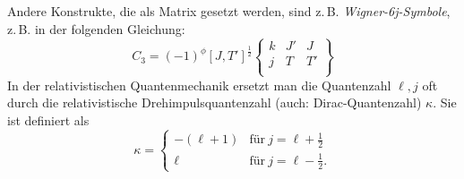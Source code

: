\documentclass[a4paper, 10pt,onecolumn]{scrartcl}
\begin{document}
Andere Konstrukte, die als Matrix gesetzt werden, sind z.\,B. \emph{Wigner-\emph{6j}-Symbole}, z.\,B. in der folgenden Gleichung:
\[
C_3=(-1)^\phi[J,T']^{\frac{1}{2}} 
\begin{Bmatrix}
	k & J' & J \\
	j & T & T'\\
\end{Bmatrix}
\]  
In der relativistischen Quantenmechanik ersetzt man die Quantenzahl $\ell, j$ oft durch die relativistische Drehimpulsquantenzahl (auch: Dirac-Quantenzahl) $\kappa$. Sie ist definiert als 
\[
\kappa=
\begin{cases}
	-(\ell + 1) & \text{für}\ j = \ell + \frac{1}{2} \\
	\ell & \text{für}\ j = \ell - \frac{1}{2}.
\end{cases}
\]
\end{document}
